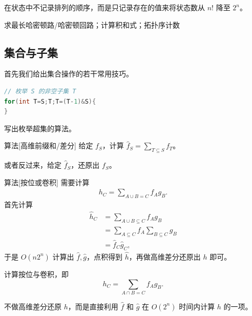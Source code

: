 在状态中不记录排列的顺序，而是只记录存在的值来将状态数从 $n!$ 降至 $2^n$。

\begin{example}[挑战 NP Hard]
    求最长哈密顿路/哈密顿回路；计算积和式；拓扑序计数
\end{example}

\begin{example}[{P6622 [省选联考 2020 A/B 卷] 信号传递}]
    
\end{example}

\begin{example}[{P2157 [SDOI2009] 学校食堂}]
    
\end{example}




\subsection{集合与子集}

首先我们给出集合操作的若干常用技巧。

\begin{lstlisting}[language=C++,caption={枚举子集}]
// 枚举 S 的非空子集 T
for(int T=S;T;T=(T-1)&S){
}
\end{lstlisting}
\begin{exercise}
    写出枚举超集的算法。
\end{exercise}

\begin{descbox}{算法}[高维前缀和/差分]
    给定 $f_S$，计算 $\hat f_{S}=\sum_{T\subseteq S}f_T$。

    或者反过来，给定 $\hat f_S$，还原出 $f_S$。
\end{descbox}

\begin{descbox}{算法}[按位或卷积]
    需要计算
    $$
    \begin{aligned}
    h_C=\sum_{A\cup B=C}f_Ag_B.
    \end{aligned}
    $$
    首先计算
    $$
    \begin{aligned}
    \hat h_C&=\sum_{A\cup B\subseteq C}f_Ag_B\\
    &=\sum_{A\subseteq C}f_A\sum_{B\subseteq C}g_B\\
    &=\hat f_C\hat g_C,
    \end{aligned}
    $$
    于是 $O(n2^n)$ 计算出 $\hat f,\hat g$，点积得到 $\hat h$，再做高维差分还原出 $h$ 即可。
\end{descbox}
\begin{exercise}
    计算按位与卷积，即
    $$
    h_C=\sum_{A\cap B=C}f_Ag_B.
    $$
\end{exercise}
\begin{exercise}
    不做高维差分还原 $h$，而是直接利用 $\hat f$ 和 $\hat g$ 在 $O(2^n)$ 时间内计算 $h$ 的一项。
\end{exercise}

